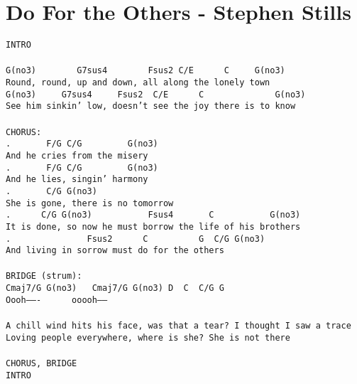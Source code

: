 \newpage
\section{Do For the Others - Stephen Stills}
\label{Do For the Others - Stephen Stills}
\texttt{INTRO\\
\\
G(no3)\ \ \ \ \ \ \ \ G7sus4\ \ \ \ \ \ \ \ Fsus2\ C/E\ \ \ \ \ \ C\ \ \ \ \ G(no3)\\
Round,\ round,\ up\ and\ down,\ all\ along\ the\ lonely\ town\\
G(no3)\ \ \ \ \ G7sus4\ \ \ \ \ Fsus2\ \ C/E\ \ \ \ \ \ C\ \ \ \ \ \ \ \ \ \ \ \ \ \ G(no3)\\
See\ him\ sinkin'\ low,\ doesn't\ see\ the\ joy\ there\ is\ to\ know\\
\\
CHORUS:\\
.\ \ \ \ \ \ \ F/G\ C/G\ \ \ \ \ \ \ \ \ G(no3)\\
And\ he\ cries\ from\ the\ misery\\
.\ \ \ \ \ \ \ F/G\ C/G\ \ \ \ \ \ \ \ \ G(no3)\\
And\ he\ lies,\ singin'\ harmony\\
.\ \ \ \ \ \ \ C/G\ G(no3)\\
She\ is\ gone,\ there\ is\ no\ tomorrow\\
.\ \ \ \ \ \ C/G\ G(no3)\ \ \ \ \ \ \ \ \ \ \ Fsus4\ \ \ \ \ \ \ C\ \ \ \ \ \ \ \ \ \ \ G(no3)\\
It\ is\ done,\ so\ now\ he\ must\ borrow\ the\ life\ of\ his\ brothers\\
.\ \ \ \ \ \ \ \ \ \ \ \ \ \ \ Fsus2\ \ \ \ \ \ C\ \ \ \ \ \ \ \ \ \ G\ \ C/G\ G(no3)\\
And\ living\ in\ sorrow\ must\ do\ for\ the\ others\\
\\
BRIDGE\ (strum):\\
Cmaj7/G\ G(no3)\ \ \ Cmaj7/G\ G(no3)\ D\ \ C\ \ C/G\ G\\
Oooh-------\ \ \ \ \ \ ooooh------\\
\\
A\ chill\ wind\ hits\ his\ face,\ was\ that\ a\ tear?\ I\ thought\ I\ saw\ a\ trace\\
Loving\ people\ everywhere,\ where\ is\ she?\ She\ is\ not\ there\\
\\
CHORUS,\ BRIDGE\\
INTRO\\
\\
}
